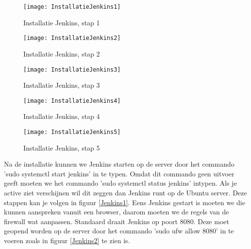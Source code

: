     \begin{figure}
        \centering
        \texttt{[image: InstallatieJenkins1]}
        \caption{Installatie Jenkins, stap 1} \label{InstallatieJenkins1}
    \end{figure}
    
    \begin{figure}	
        \centering
        \texttt{[image: InstallatieJenkins2]}
        \caption{Installatie Jenkins, stap 2} \label{InstallatieJenkins2}
    \end{figure}
    
    \begin{figure}	
        \centering
        \texttt{[image: InstallatieJenkins3]}
        \caption{Installatie Jenkins, stap 3} \label{InstallatieJenkins3}
    \end{figure}
    
    \begin{figure}	
        \centering
        \texttt{[image: InstallatieJenkins4]}
        \caption{Installatie Jenkins, stap 4} \label{InstallatieJenkins4}
    \end{figure}
    
    \begin{figure}	
        \centering
        \texttt{[image: InstallatieJenkins5]}
        \caption{Installatie Jenkins, stap 5} \label{InstallatieJenkins5}
    \end{figure}

    
    Na de installatie kunnen we Jenkins starten op de server door het commando 'sudo systemctl start jenkins' in te typen. Omdat dit commando geen uitvoer geeft moeten we het commando 'sudo systemctl status jenkins' intypen. Als je active ziet verschijnen wil dit zeggen dan Jenkins runt op de Ubuntu server. Deze stappen kan je volgen in figuur \ref{Jenkins1}.
    Eens Jenkins gestart is moeten we die kunnen aanspreken vanuit een browser, daarom moeten we de regels van de firewall wat aanpassen. Standaard draait Jenkins op poort 8080. Deze moet geopend worden op de server door het commando 'sudo ufw allow 8080' in te voeren zoals in figuur \ref{Jenkins2} te zien is.
    
